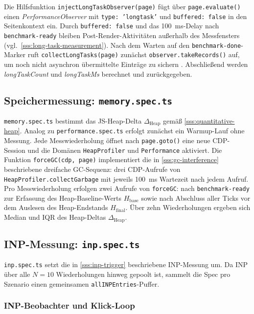 Die Hilfsfunktion \texttt{injectLongTaskObserver(page)} fügt über \texttt{page.evaluate()} einen \textit{PerformanceObserver} mit \texttt{type: 'longtask'} und \texttt{buffered: false} in den Seitenkontext ein. Durch \texttt{buffered: false} und das \qty{100}{ms}-Delay nach \texttt{benchmark-ready} bleiben Post-Render-Aktivitäten außerhalb des Messfensters (vgl.~\cref{sss:long-task-measurement}). Nach dem Warten auf den \texttt{benchmark-done}-Marker ruft \texttt{collectLongTasks(page)} zunächst \texttt{observer.takeRecords()} auf, um noch nicht asynchron übermittelte Einträge zu sichern \cite{mdn-performance-observer-2024, w3c_longtasks_2026}. Abschließend werden \textit{longTaskCount} und \textit{longTaskMs} berechnet und zurückgegeben.

\subsection{Speichermessung: \texttt{memory.spec.ts}}
\label{ss:impl-memory-spec}

\texttt{memory.spec.ts} bestimmt das JS-Heap-Delta $\Delta_{\mathrm{Heap}}$ gemäß \cref{sss:quantitative-heap}. Analog zu \texttt{performance.spec.ts} erfolgt zunächst ein Warmup-Lauf ohne Messung. Jede Messwiederholung öffnet nach \texttt{page.goto()} eine neue CDP-Session und die Domänen \texttt{HeapProfiler} und \texttt{Performance} aktiviert. Die Funktion \texttt{forceGC(cdp, page)} implementiert die in \cref{sss:gc-interference} beschriebene dreifache GC-Sequenz: drei CDP-Aufrufe von \texttt{HeapProfiler.collectGarbage} mit jeweils \qty{100}{ms} Wartezeit nach jedem Aufruf. Pro Messwiederholung erfolgen zwei Aufrufe von \texttt{forceGC}: nach \texttt{benchmark-ready} zur Erfassung des Heap-Baseline-Werts $H_{\mathrm{base}}$ sowie nach Abschluss aller Ticks vor dem Auslesen des Heap-Endstands $H_{\mathrm{final}}$. Über zehn Wiederholungen ergeben sich Median und IQR des Heap-Deltas $\Delta_{\mathrm{Heap}}$.

\subsection{INP-Messung: \texttt{inp.spec.ts}}
\label{ss:impl-inp-spec}

\texttt{inp.spec.ts} setzt die in \cref{sss:inp-trigger} beschriebene INP-Messung um. Da INP über alle $N=10$ Wiederholungen hinweg gepoolt ist, sammelt die Spec pro Szenario einen gemeinsamen \texttt{allINPEntries}-Puffer.

\subsubsection{INP-Beobachter und Klick-Loop}
\label{sss:impl-inp-observer}

